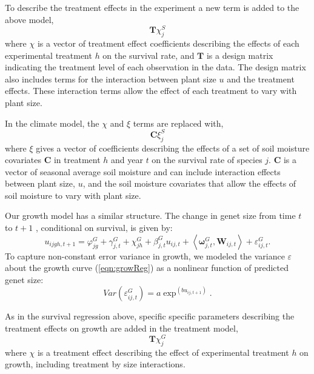 \documentclass[11pt]{article}
\begin{document}
\begin{doublespacing}
To describe the treatment effects in the experiment a new term is added to the above model,
\begin{equation}
 \boldsymbol{T}\chi_{j}^S
\label{eqn:survT}
\end{equation}
where $\chi$ is a vector of treatment effect coefficients describing the effects of each experimental treatment $h$ on the survival rate, and $\boldsymbol{T}$ is a design matrix indicating the treatment level of each observation in the data. The design matrix also includes terms for the interaction between plant size $u$ and the treatment effects. These interaction terms allow the effect of each treatment to vary with plant size.  

In the climate model, the $\chi$ and $\xi$ terms are replaced with, 
\begin{equation}
\boldsymbol{C}\xi_{j}^S 
\label{eqn:survC}
\end{equation}
where $\xi$ gives a vector of coefficients describing the effects of a set of soil moisture covariates $\boldsymbol{C}$ in treatment $h$ and year $t$ on the survival rate of species $j$. $\boldsymbol{C}$ is a vector of seasonal average soil moisture and can include interaction effects between plant size, $u$, and the soil moisture covariates that allow the effects of soil moisture to vary with plant size. 

Our growth model has a similar structure. The change in genet size from time $t$ to $t+1$ , conditional on survival, is given by:
\begin{equation}
u_{ijgh,t+1} = \varphi_{jg}^G + \gamma_{j,t}^G + \chi_{jh}^G  + \beta_{j,t}^G u_{ij,t} + 
\left \langle  \boldsymbol{\omega}_{j,t}^G, \boldsymbol{W}_{ij,t} \right \rangle + \varepsilon_{ij,t}^G .
\label{eqn:growReg}
\end{equation}
To capture non-constant error variance in growth, we modeled the variance $\varepsilon$  about the growth curve (\ref{eqn:growReg})  as a nonlinear function of predicted genet size:
\begin{equation}
Var(\varepsilon_{ij,t}^G) = a \exp ^{(bu_{ij,t+1})} .
\label{eqn:growVar}
\end{equation}

As in the survival regression above, specific specific parameters describing the treatment effects on growth are added in the treatment model, 
\begin{equation}
\boldsymbol{T} \chi_{j}^G 
\label{eqn:growT}
\end{equation}
where $\chi$ is a treatment effect describing the effect of experimental treatment $h$ on growth, including treatment by size interactions.


\end{doublespacing}
\end{document}
